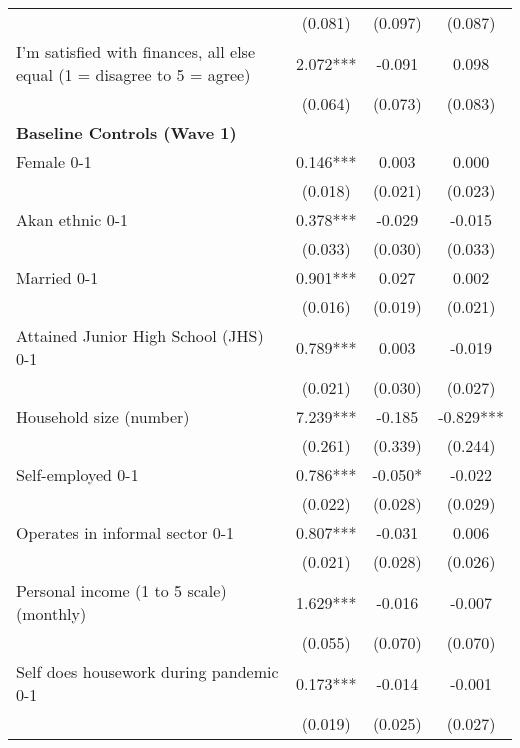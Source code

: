 \begin{ThreePartTable}
\begin{table}[tbp]
\begin{tabular}{lccc}
                   &      (0.081)     &      (0.097)     &      (0.087)     \\ [0.1em] 
 I'm satisfied with finances, all else equal (1 = disagree to 5 = agree) & 2.072*** & -0.091 & 0.098 \\ [0.1em] 
                   &      (0.064)     &      (0.073)     &      (0.083)     \\ [0.1em] 
\textbf{Baseline Controls (Wave 1)} & & & \\ 
 Female 0-1 & 0.146*** & 0.003 & 0.000 \\ [0.1em] 
                   &      (0.018)     &      (0.021)     &      (0.023)     \\ [0.1em] 
 Akan ethnic 0-1 & 0.378*** & -0.029 & -0.015 \\ [0.1em] 
                   &      (0.033)     &      (0.030)     &      (0.033)     \\ [0.1em] 
 Married 0-1 & 0.901*** & 0.027 & 0.002 \\ [0.1em] 
                   &      (0.016)     &      (0.019)     &      (0.021)     \\ [0.1em] 
 Attained Junior High School (JHS) 0-1 & 0.789*** & 0.003 & -0.019 \\ [0.1em] 
                   &      (0.021)     &      (0.030)     &      (0.027)     \\ [0.1em] 
 Household size (number) & 7.239*** & -0.185 & -0.829*** \\ [0.1em] 
                   &      (0.261)     &      (0.339)     &      (0.244)     \\ [0.1em] 
 Self-employed 0-1 & 0.786*** & -0.050* & -0.022 \\ [0.1em] 
                   &      (0.022)     &      (0.028)     &      (0.029)     \\ [0.1em] 
 Operates in informal sector 0-1 & 0.807*** & -0.031 & 0.006 \\ [0.1em] 
                   &      (0.021)     &      (0.028)     &      (0.026)     \\ [0.1em] 
 Personal income (1 to 5 scale) (monthly) & 1.629*** & -0.016 & -0.007 \\ [0.1em] 
                   &      (0.055)     &      (0.070)     &      (0.070)     \\ [0.1em] 
 Self does housework during pandemic 0-1 & 0.173*** & -0.014 & -0.001 \\ [0.1em] 
                   &      (0.019)     &      (0.025)     &      (0.027)     \\ [0.1em] 

\end{tabular}
\end{table}
\end{ThreePartTable}
